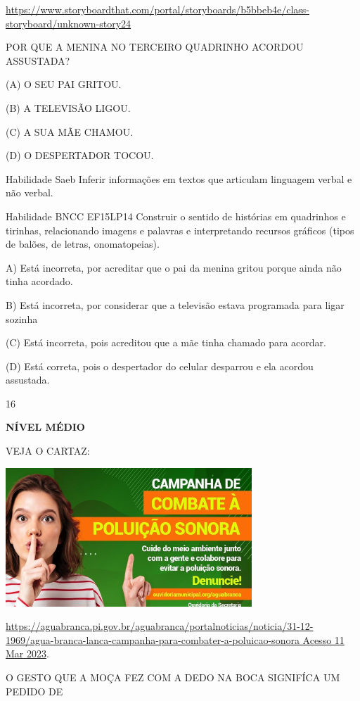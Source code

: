 {{\url{https://www.storyboardthat.com/portal/storyboards/b5bbeb4e/class-storyboard/unknown-story24}

POR QUE A MENINA NO TERCEIRO QUADRINHO ACORDOU ASSUSTADA?

(A) O SEU PAI GRITOU.

(B) A TELEVISÃO LIGOU.

(C) A SUA MÃE CHAMOU.

(D) O DESPERTADOR TOCOU.

\protect\hypertarget{_Hlk129586447}{}{}Habilidade Saeb Inferir
informações em textos que articulam linguagem verbal e não verbal.

Habilidade BNCC EF15LP14 Construir o sentido de histórias em quadrinhos
e tirinhas, relacionando imagens e palavras e interpretando recursos
gráficos (tipos de balões, de letras, onomatopeias).

A) Está incorreta, por acreditar que o pai da menina gritou porque ainda
não tinha acordado.

B) Está incorreta, por considerar que a televisão estava programada para
ligar sozinha

(C) Está incorreta, pois acreditou que a mãe tinha chamado para acordar.

(D) Está correta, pois o despertador do celular desparrou e ela acordou
assustada.

\num{16}

\textbf{NÍVEL MÉDIO}

VEJA O CARTAZ:

\includegraphics[width=3.64744in,height=2.05233in]{media/image173.png}

\href{https://aguabranca.pi.gov.br/aguabranca/portalnoticias/noticia/31-12-1969/agua-branca-lanca-campanha-para-combater-a-poluicao-sonora\%20Acesso\%2011\%20Mar\%202023}{https://aguabranca.pi.gov.br/aguabranca/portalnoticias/noticia/31-12-1969/agua-branca-lanca-campanha-para-combater-a-poluicao-sonora
Acesso 11 Mar 2023}.

O GESTO QUE A MOÇA FEZ COM A DEDO NA BOCA SIGNIFÍCA UM PEDIDO DE

}}
